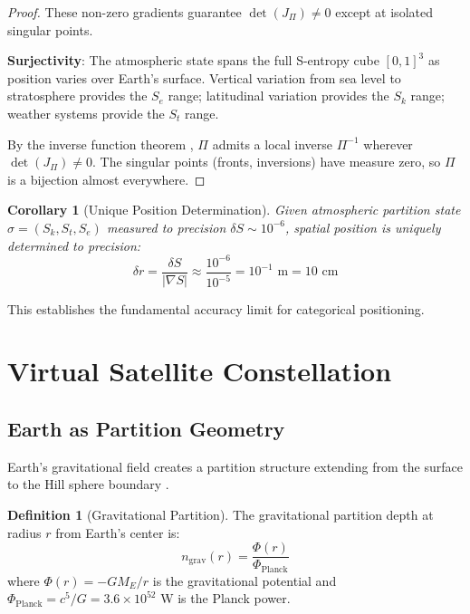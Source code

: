 \documentclass[twocolumn,10pt,a4paper]{article}
\newtheorem{corollary}[theorem]{Corollary}
\theoremstyle{definition}
\newtheorem{definition}[theorem]{Definition}
\theoremstyle{remark}
\begin{document}
\begin{proof}
These non-zero gradients guarantee $\det(J_\Pi) \neq 0$ except at isolated singular points.

\textbf{Surjectivity}: The atmospheric state spans the full S-entropy cube $[0,1]^3$ as position varies over Earth's surface. Vertical variation from sea level to stratosphere provides the $S_e$ range; latitudinal variation provides the $S_k$ range; weather systems provide the $S_t$ range.

By the inverse function theorem \cite{rudin1976principles}, $\Pi$ admits a local inverse $\Pi^{-1}$ wherever $\det(J_\Pi) \neq 0$. The singular points (fronts, inversions) have measure zero, so $\Pi$ is a bijection almost everywhere.
\end{proof}

\begin{corollary}[Unique Position Determination]
\label{cor:unique}
Given atmospheric partition state $\sigma = (S_k, S_t, S_e)$ measured to precision $\delta S \sim 10^{-6}$, spatial position is uniquely determined to precision:
\begin{equation}
    \delta r = \frac{\delta S}{|\nabla S|} \approx \frac{10^{-6}}{10^{-5}} = 10^{-1} \text{ m} = 10 \text{ cm}
\end{equation}
\end{corollary}

This establishes the fundamental accuracy limit for categorical positioning.

\section{Virtual Satellite Constellation}
\label{sec:satellites}

\subsection{Earth as Partition Geometry}

Earth's gravitational field creates a partition structure extending from the surface to the Hill sphere boundary \cite{chenciner2007hill}.

\begin{definition}[Gravitational Partition]
\label{def:grav_partition}
The gravitational partition depth at radius $r$ from Earth's center is:
\begin{equation}
    n_{\text{grav}}(r) = \frac{\Phi(r)}{\Phi_{\text{Planck}}}
\end{equation}
where $\Phi(r) = -GM_E/r$ is the gravitational potential and $\Phi_{\text{Planck}} = c^5/G = 3.6 \times 10^{52}$ W is the Planck power.
\end{definition}
\end{document}
